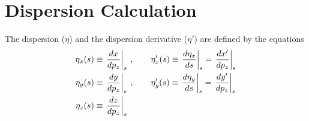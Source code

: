 \section{Dispersion Calculation}
\label{s:dispersion}

The dispersion ($\eta$) and the dispersion derivative ($\eta'$) are defined by the equations
\begin{align}
  \eta_x(s) &\equiv \left. \frac{dx}{dp_z} \right|_s \> , \qquad
    \eta'_x(s) \equiv \left. \frac{d\eta_x}{ds} \right|_s
    = \left. \frac{dx'}{dp_z} \right|_s \nonumber \\
  \eta_y(s) &\equiv \left. \frac{dy}{dp_z} \right|_s \> , \qquad
    \eta'_y(s) \equiv \left. \frac{d\eta_y}{ds} \right|_s
    = \left. \frac{dy'}{dp_z} \right|_s \\
  \eta_z(s) &\equiv \left. \frac{dz}{dp_z} \right|_s \nonumber
\end{align}

